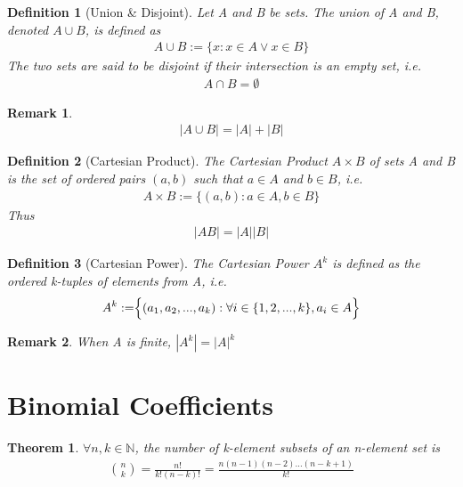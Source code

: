 \documentclass[11pt, oneside]{book}
\theoremstyle{break}
\newtheorem{thm}{Theorem}[section]
\newtheorem{defn}{Definition}[section]
\newtheorem*{remark}{Remark}
\newcommand{\bb}[1]{\mathbb{#1}}		%
\begin{document}
\begin{defn}[Union \& Disjoint]
	Let A and B be sets. The union of A and B, denoted $A \cup B$, is defined as
	\begin{gather*}
		A \cup B := \{x : x \in A \lor x \in B\}
	\end{gather*}
	The two sets are said to be disjoint if their intersection is an empty set, i.e.
	\begin{gather*}
		A \cap B = \emptyset
	\end{gather*}
\end{defn}

\begin{remark}
	\begin{gather*}
		|A \cup B| = |A| + |B|
	\end{gather*}
\end{remark}

\begin{defn}[Cartesian Product]
	The Cartesian Product $A \times B$ of sets A and B is the set of ordered pairs $(a ,b)$ such that $a \in A$ and $b \in B$, i.e.
	\begin{gather*}
		A \times B := \{(a,b) : a \in A, b \in B \}
	\end{gather*}
	Thus
	\begin{gather*}
		|AB| = |A||B|
	\end{gather*}
\end{defn}

\begin{defn}[Cartesian Power]
	The Cartesian Power $A^k$ is defined as the ordered k-tuples of elements from A, i.e.
	\begin{gather*}
		A^k := \Bigr\{(a_1, a_2, ..., a_k): \forall i \in \{1, 2, ..., k\}, a_i \in A\Bigl\}
	\end{gather*}
\end{defn}

\begin{remark}
	When A is finite, $|A^k| = |A|^k$
\end{remark}


\section{Binomial Coefficients}

\begin{thm}
	$\forall n,k \in \bb{N}$, the number of k-element subsets of an n-element set is
	\begin{gather*}
		\binom{n}{k} = \frac{n!}{k!(n-k)!} = \frac{n(n-1)(n-2)\hdots(n-k+1)}{k!}
	\end{gather*}
\end{thm}
\end{document}
